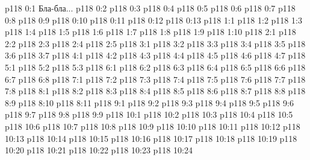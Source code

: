 \author{Могущественный Посланник}
\vs p118 0:1  Бла-бла...
\vs p118 0:2 
\vs p118 0:3 
\vs p118 0:4 
\vs p118 0:5 
\vs p118 0:6 
\vs p118 0:7 
\vs p118 0:8 
\vs p118 0:9 \pc 
\vs p118 0:10 \pc 
\vs p118 0:11 
\vs p118 0:12 
\vs p118 0:13 
\vs p118 1:1 
\vs p118 1:2 \pc 
\vs p118 1:3 
\vs p118 1:4 
\vs p118 1:5 
\vs p118 1:6 \pc 
\vs p118 1:7 \pc 
\vs p118 1:8 
\vs p118 1:9 
\vs p118 1:10 
\vs p118 2:1 
\vs p118 2:2 \pc 
\vs p118 2:3 
\vs p118 2:4 
\vs p118 2:5 
\vs p118 3:1 
\vs p118 3:2 \pc 
\vs p118 3:3 
\vs p118 3:4 
\vs p118 3:5 \pc 
\vs p118 3:6 
\vs p118 3:7 
\vs p118 4:1 
\vs p118 4:2 
\vs p118 4:3 \pc 
\vs p118 4:4 
\vs p118 4:5 
\vs p118 4:6 
\vs p118 4:7 
\vs p118 5:1 
\vs p118 5:2 \pc 
\vs p118 5:3 
\vs p118 6:1 
\vs p118 6:2 
\vs p118 6:3 \pc 
\vs p118 6:4 
\vs p118 6:5 
\vs p118 6:6 
\vs p118 6:7 
\vs p118 6:8 \pc 
{}
\vs p118 7:1 
\vs p118 7:2 
\vs p118 7:3 \pc 
\vs p118 7:4 
\vs p118 7:5 
\vs p118 7:6 \pc 
\vs p118 7:7 
\vs p118 7:8 
\vs p118 8:1 
\vs p118 8:2 
\vs p118 8:3 \pc 
\vs p118 8:4 
\vs p118 8:5 
\vs p118 8:6 
\vs p118 8:7 
\vs p118 8:8 
\vs p118 8:9 
\vs p118 8:10 
\vs p118 8:11 
\vs p118 9:1 
\vs p118 9:2 
\vs p118 9:3 
\vs p118 9:4 
\vs p118 9:5 
\vs p118 9:6 
\vs p118 9:7 
\vs p118 9:8 
\vs p118 9:9 \pc 
{}
\vs p118 10:1 
\vs p118 10:2 \pc 
\vs p118 10:3 
\vs p118 10:4 
\vs p118 10:5 \pc 
\vs p118 10:6 
\vs p118 10:7 
\vs p118 10:8 
\vs p118 10:9 
\vs p118 10:10 
\vs p118 10:11 
\vs p118 10:12 \pc 
\vs p118 10:13 
\vs p118 10:14 
\vs p118 10:15 
\vs p118 10:16 \pc 
\vs p118 10:17 \pc 
\vs p118 10:18 
\vs p118 10:19 \pc 
\vs p118 10:20 
\vs p118 10:21 
\vs p118 10:22 
\vs p118 10:23 \pc 
\vsetoff
\vs p118 10:24 
\quizlink
